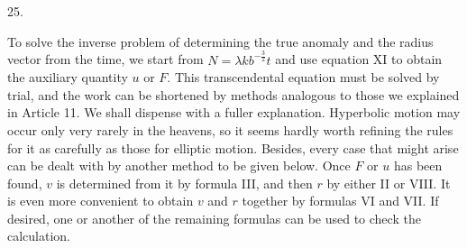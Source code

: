 \par{}
\begin{center}
\hypertarget{native-042-article025}{}25.
\end{center}
To solve the inverse problem of determining the true anomaly and the radius vector from the time, we start from $N=\lambda kb^{-\frac{3}{2}}t$ and use equation XI to obtain the auxiliary quantity $u$ or $F$. This transcendental equation must be solved by trial, and the work can be shortened by methods analogous to those we explained in Article 11. We shall dispense with a fuller explanation. Hyperbolic motion may occur only very rarely in the heavens, so it seems hardly worth refining the rules for it as carefully as those for elliptic motion. Besides, every case that might arise can be dealt with by another method to be given below. Once $F$ or $u$ has been found, $v$ is determined from it by formula III, and then $r$ by either II or VIII. It is even more convenient to obtain $v$ and $r$ together by formulas VI and VII. If desired, one or another of the remaining formulas can be used to check the calculation.

